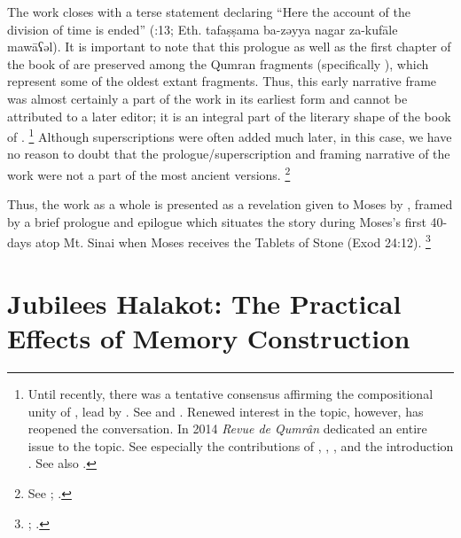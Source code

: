 %
\noindent
The work closes with a terse statement declaring ``Here the account of the division of time is ended'' (:13; Eth. 
        {tafaṣṣama ba-zəyya nagar za-kufāle mawāʕəl}).
\noindent
It is important to note that this prologue as well as the first chapter of the book of \jub are preserved among the Qumran fragments (specifically ), which represent some of the oldest extant \jub fragments. Thus, this early narrative frame was almost certainly a part of the work in its earliest form and cannot be attributed to a later editor; it is an integral part of the literary shape of the book of \jub.%
    \footnote{%
        Until recently, there was a tentative consensus affirming the compositional unity of \jub, lead by \vanderkam. See \cite{vander} and \cite{vanderkam_cbr2008}. Renewed interest in the topic, however, has reopened the conversation. In 2014 \emph{Revue de Qumrân} dedicated an entire issue to the topic. See especially the contributions of 
            \cite{vanderkam_rev-qumran2014},
            \cite{kugel_rev-qumran2014},
            \cite{tigchelaar_rev-qumran2014}, and the introduction
            \cite{najman-tigchelaar_rev-qumran2014}. See also 
            \cite{monger_jsp2017}.}
Although superscriptions were often added much later, in this case, we have no reason to doubt that the prologue/superscription and framing narrative of the work were not a part of the most ancient versions.%
        \footnote{%
            See 
            \cite[1:125]{vanderkam2018};
            \cite[25]{vanderkam_metso-etal2010}.}

Thus, the work as a whole is presented as a revelation given to Moses by \yahweh, framed by a brief prologue and epilogue which situates the story during Moses's first 40-days atop Mt. Sinai when Moses receives the Tablets of Stone (Exod 24:12).%
    \footnote{%
        \Cite[1:129]{vanderkam2018};
        \cite{vanderkam_vanderkam2000}.}


\section{Jubilees Halakot: The Practical Effects of Memory Construction}

